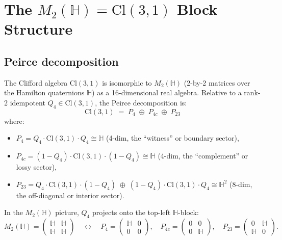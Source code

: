 \documentclass[11pt,a4paper]{article}
\theoremstyle{plain}
\theoremstyle{definition}
\theoremstyle{remark}
\numberwithin{equation}{section}
\providecommand{\Cl}{\mathrm{Cl}}
\providecommand{\HH}{\mathbb{H}}
\begin{document}
\section{The \texorpdfstring{$M_2(\HH) = \Cl(3,1)$}{M2(H) = Cl(3,1)} Block Structure}\label{sec:block}

\subsection{Peirce decomposition}

The Clifford algebra $\Cl(3,1)$ is isomorphic to $M_2(\HH)$ (2-by-2
matrices over the Hamilton quaternions $\HH$) as a 16-dimensional real
algebra.  Relative to a rank-2 idempotent $Q_4 \in \Cl(3,1)$, the
Peirce decomposition is:
\[
  \Cl(3,1) \;=\; P_4 \;\oplus\; P_{4c} \;\oplus\; P_{23}
\]
where:
\begin{itemize}
\item $P_4 = Q_4 \cdot \Cl(3,1) \cdot Q_4 \cong \HH$ (4-dim, the ``witness'' or boundary sector),
\item $P_{4c} = (1-Q_4) \cdot \Cl(3,1) \cdot (1-Q_4) \cong \HH$ (4-dim, the ``complement'' or lossy sector),
\item $P_{23} = Q_4 \cdot \Cl(3,1) \cdot (1-Q_4) \;\oplus\; (1-Q_4) \cdot \Cl(3,1) \cdot Q_4 \cong \HH^2$ (8-dim, the off-diagonal or interior sector).
\end{itemize}

In the $M_2(\HH)$ picture, $Q_4$ projects onto the top-left $\HH$-block:
\[
  M_2(\HH) =
  \begin{pmatrix} \HH & \HH \\ \HH & \HH \end{pmatrix}
  \quad\longleftrightarrow\quad
  P_4 = \begin{pmatrix} \HH & 0 \\ 0 & 0 \end{pmatrix}, \quad
  P_{4c} = \begin{pmatrix} 0 & 0 \\ 0 & \HH \end{pmatrix}, \quad
  P_{23} = \begin{pmatrix} 0 & \HH \\ \HH & 0 \end{pmatrix}.
\]
\end{document}
